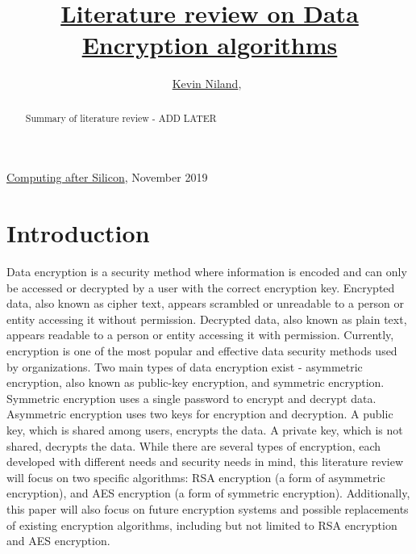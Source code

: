 \documentclass[journal]{IEEEtran}
\begin{document}
%
{\href{https://github.com/kevinniland97/Literature-review-on-Data-Encryption-algorithm}{Computing after Silicon}, November 2019}

\title{\href{https://github.com/kevinniland97/Literature-review-on-Data-Encryption-algorithms}{Literature review on Data Encryption algorithms}}
\author{\href{https://github.com/kevinniland97}{Kevin Niland},~}
\maketitle

\begin{abstract}
    Summary of literature review - ADD LATER
\end{abstract}

\section{\textbf{Introduction}}
Data encryption is a security method where information is encoded and can only be accessed or decrypted by a user with the correct encryption key. Encrypted data, also known as cipher text, appears scrambled or unreadable to a person or entity accessing it without permission. Decrypted data, also known as plain text, appears readable to a person or entity accessing it with permission. Currently, encryption is one of the most popular and effective data security methods used by organizations. Two main types of data encryption exist - asymmetric encryption, also known as public-key encryption, and symmetric encryption. Symmetric encryption uses a single password to encrypt and decrypt data. Asymmetric encryption uses two keys for encryption and decryption. A public key, which is shared among users, encrypts the data. A private key, which is not shared, decrypts the data. While there are several types of encryption, each developed with different needs and security needs in mind, this literature review will focus on two specific algorithms: RSA encryption (a form of asymmetric encryption), and AES encryption (a form of symmetric encryption). Additionally, this paper will also focus on future encryption systems and possible replacements of existing encryption algorithms, including but not limited to RSA encryption and AES encryption.
\end{document}
